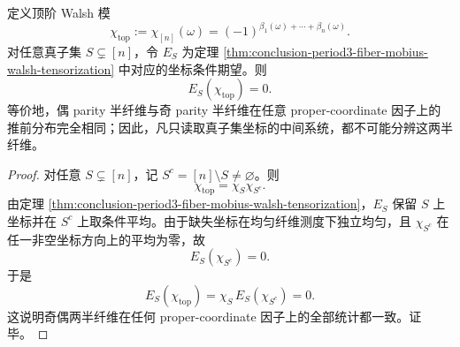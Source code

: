 \begin{theorem}\label{thm:conclusion-period3-fiber-proper-coordinate-top-parity-blindness}
定义顶阶 Walsh 模
\[
\chi_{\mathrm{top}}:=\chi_{[n]}(\omega)=(-1)^{\beta_1(\omega)+\cdots+\beta_n(\omega)}.
\]
对任意真子集 \(S\subsetneq[n]\)，令 \(E_S\) 为定理 \ref{thm:conclusion-period3-fiber-mobius-walsh-tensorization} 中对应的坐标条件期望。则
\[
E_S(\chi_{\mathrm{top}})=0.
\]
等价地，偶 parity 半纤维与奇 parity 半纤维在任意 proper-coordinate 因子上的推前分布完全相同；因此，凡只读取真子集坐标的中间系统，都不可能分辨这两半纤维。
\end{theorem}
\begin{proof}
对任意 \(S\subsetneq[n]\)，记 \(S^c=[n]\setminus S\neq\varnothing\)。则
\[
\chi_{\mathrm{top}}=\chi_S\chi_{S^c}.
\]
由定理 \ref{thm:conclusion-period3-fiber-mobius-walsh-tensorization}，\(E_S\) 保留 \(S\) 上坐标并在 \(S^c\) 上取条件平均。由于缺失坐标在均匀纤维测度下独立均匀，且 \(\chi_{S^c}\) 在任一非空坐标方向上的平均为零，故
\[
E_S(\chi_{S^c})=0.
\]
于是
\[
E_S(\chi_{\mathrm{top}})
=
\chi_S\,E_S(\chi_{S^c})
=0.
\]
这说明奇偶两半纤维在任何 proper-coordinate 因子上的全部统计都一致。证毕。
\end{proof}

